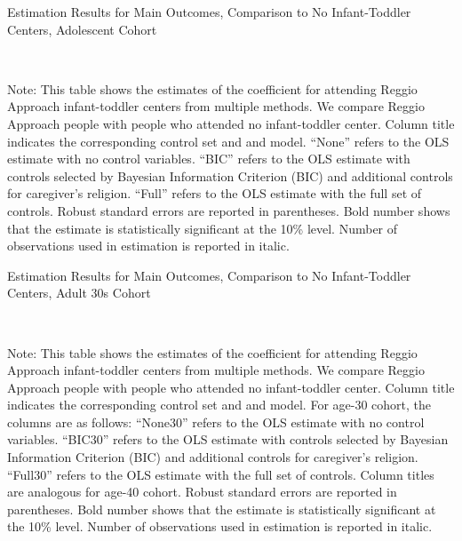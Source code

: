 \begin{table}[H] \caption{Estimation Results for Main Outcomes, Comparison to No Infant-Toddler Centers, Adolescent Cohort} \label{ols-M-adol-reg-nopres-asilo}
\scalebox{0.8}{}
\vspace{1ex} \\
\footnotesize\raggedright{Note: This table shows the estimates of the coefficient for attending Reggio Approach infant-toddler centers from multiple methods. We compare Reggio Approach people with people who attended no infant-toddler center. Column title indicates the corresponding control set and and model. ``None'' refers to the OLS estimate with no control variables. ``BIC'' refers to the OLS estimate with controls selected by Bayesian Information Criterion (BIC) and additional controls for caregiver's religion. ``Full'' refers to the OLS estimate with the full set of controls. Robust standard errors are reported in parentheses. Bold number shows that the estimate is statistically significant at the 10\% level. Number of observations used in estimation is reported in italic.}
\end{table}



\begin{table}[H] \caption{Estimation Results for Main Outcomes, Comparison to No Infant-Toddler Centers, Adult 30s Cohort} \label{ols-M-adult30-reg-nopres-asilo}
\scalebox{0.75}{}
\vspace{1ex} \\
\footnotesize\raggedright{Note: This table shows the estimates of the coefficient for attending Reggio Approach infant-toddler centers from multiple methods. We compare Reggio Approach people with people who attended no infant-toddler center. Column title indicates the corresponding control set and and model. For age-30 cohort, the columns are as follows: ``None30'' refers to the OLS estimate with no control variables. ``BIC30'' refers to the OLS estimate with controls selected by Bayesian Information Criterion (BIC) and additional controls for caregiver's religion. ``Full30'' refers to the OLS estimate with the full set of controls. Column titles are analogous for age-40 cohort. Robust standard errors are reported in parentheses. Bold number shows that the estimate is statistically significant at the 10\% level. Number of observations used in estimation is reported in italic.}
\end{table}



